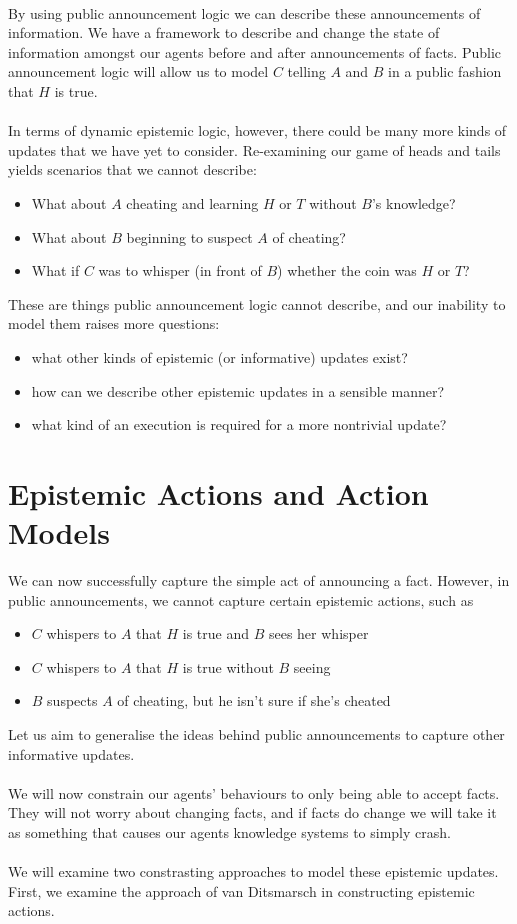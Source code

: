 \documentclass[12pt, a4paper, twoside]{article}
\begin{document}
\\
By using public announcement logic we can describe these announcements of
information.
We have a framework to describe and change the state of information amongst our
agents before and after announcements of facts.
Public announcement logic will allow us to model $C$ telling $A$ and $B$ in a
public fashion that $H$ is true.\\
\\
In terms of dynamic epistemic logic, however, there could be many more kinds of
updates that we have yet to consider.
Re-examining our game of heads and tails yields scenarios that we cannot
describe:
\begin{itemize}
	\item What about $A$ cheating and learning $H$ or $T$ without $B$'s knowledge?
	\item What about $B$ beginning to suspect $A$ of cheating?
	\item What if $C$ was to whisper (in front of $B$) whether the coin was $H$
	or $T$?
\end{itemize}
These are things public announcement logic cannot describe, and our inability to
model them raises more questions:
\begin{itemize}
	\item what other kinds of epistemic (or informative) updates exist?
	\item how can we describe other epistemic updates in a sensible manner?
	\item what kind of an execution is required for a more nontrivial update?
\end{itemize}

\section{Epistemic Actions and Action Models} \label{estAct}
We can now successfully capture the simple act of announcing a fact.
However, in public announcements, we cannot capture certain epistemic actions,
such as
\begin{itemize} 
  \item $C$ whispers to $A$ that $H$ is true and $B$ sees her whisper
  \item $C$ whispers to $A$ that $H$ is true without $B$ seeing
  \item $B$ suspects $A$ of cheating, but he isn't sure if she's cheated
\end{itemize}
Let us aim to generalise the ideas behind public announcements to capture other
informative updates.\\
\\
We will now constrain our agents' behaviours to only being able to accept facts.
They will not worry about changing facts, and if facts do change we will take it
as something that causes our agents knowledge systems to simply crash.\\
\\
We will examine two constrasting approaches to model these epistemic updates.
First, we examine the approach of van Ditsmarsch in constructing epistemic
actions.
\end{document}
